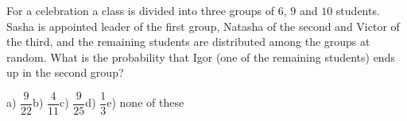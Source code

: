 For a celebration a class is divided into three groups of $6$, $9$ and $10$ students. Sasha is appointed leader of the first group, Natasha of the second and Victor of the third, and the remaining students are distributed among the groups at random. What is the probability that Igor (one of the remaining students) ends up in the second group?

a) $\dfrac9{22}$\quad b) $\dfrac4{11}$\quad c) $\dfrac9{25}$\quad d) $\dfrac13$\quad e) none of these
